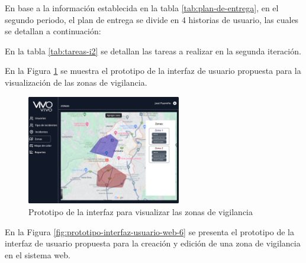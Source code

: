 En base a la información establecida en la tabla \ref{tab:plan-de-entrega}, en el segundo periodo, el plan de
entrega se divide en 4 historias de usuario, las cuales se detallan a continuación:



En la tabla \ref{tab:tareas-i2} se detallan las tareas a realizar en la segunda iteración.




En la Figura \ref{fig:prototipo-interfaz-usuario-web-5} se muestra el prototipo de la interfaz de usuario propuesta para
la visualización de las zonas de vigilancia.

\begin{figure}[H]
      \centering
      \includegraphics[width=0.6\textwidth]{chapters/III-resultados-y-discusion/resources/images/prototipo-mapa-zonas-de-vigilancia-web.png}
      \caption{Prototipo de la interfaz para visualizar las zonas de vigilancia}
      \label{fig:prototipo-interfaz-usuario-web-5}
\end{figure}

En la Figura \ref{fig:prototipo-interfaz-usuario-web-6} se presenta el prototipo de la interfaz de usuario propuesta para
la creación y edición de una zona de vigilancia en el sistema web.

